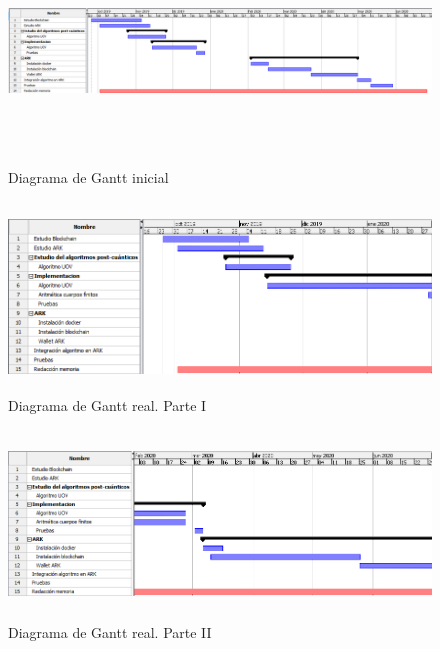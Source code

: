 \begin{landscape}
	\begin{figure}[h]
		\centering
		\hspace*{-2cm}
		\includegraphics[width=20cm,height=6cm]{figuras/Gantt_ini.png}
		\caption{Diagrama de Gantt inicial}
		\label{fig:gantt-ini}
	\end{figure}
\end{landscape}


\newpage
\begin{figure}[H]
	\centering
	\includegraphics[width=13cm,height=5cm]{figuras/Gantt_1.png}
	\caption{Diagrama de Gantt real. Parte I}
	\label{fig:gantt-real-1}
\end{figure}

\begin{figure}[H]
	\centering
	\includegraphics[width=13cm,height=5cm]{figuras/Gantt_2.png}
	\caption{Diagrama de Gantt real. Parte II}
	\label{fig:gantt-real-2}
\end{figure}

